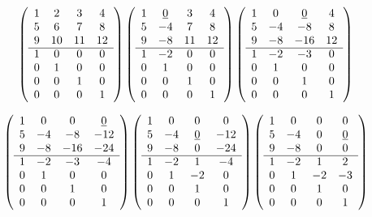 \documentclass{mai_book}
\begin{document}
{\[
\left( \begin{array}{cccc}
1 &  2 &  3 &  4 \\
5 &  6 &  7 &  8 \\
9 & 10 & 11 & 12 \\ \cline{1-4}
1 &  0 &  0 &  0 \\
0 &  1 &  0 &  0 \\
0 &  0 &  1 &  0 \\
0 &  0 &  0 &  1
\end{array} \right)
\left( \begin{array}{cccc}
1 &  \underline{0} &  3 &  4 \\
5 & -4 &  7 &  8 \\
9 & -8 & 11 & 12 \\ \cline{1-4}
1 & -2 &  0 &  0 \\
0 &  1 &  0 &  0 \\
0 &  0 &  1 &  0 \\
0 &  0 &  0 &  1
\end{array} \right) 
\left( \begin{array}{cccc}
1 &  0 &   \underline{0} &  4 \\
5 & -4 &  -8 &  8 \\
9 & -8 & -16 & 12 \\ \cline{1-4}
1 & -2 &  -3 &  0 \\
0 &  1 &   0 &  0 \\
0 &  0 &   1 &  0 \\
0 &  0 &   0 &  1
\end{array} \right) \]

\[ \left( \begin{array}{cccc}
1 &  0 &   0 &   \underline{0} \\
5 & -4 &  -8 & -12 \\
9 & -8 & -16 & -24 \\ \cline{1-4}
1 & -2 &  -3 &  -4 \\
0 &  1 &   0 &   0 \\
0 &  0 &   1 &   0 \\
0 &  0 &   0 &   1
\end{array} \right) 
\left( \begin{array}{cccc}
1 &  0 &  0 &   0 \\
5 & -4 &  \underline{0} & -12 \\
9 & -8 &  0 & -24 \\ \cline{1-4}
1 & -2 &  1 &  -4 \\
0 &  1 & -2 &   0 \\
0 &  0 &  1 &   0 \\
0 &  0 &  0 &   1
\end{array} \right) 
\left( \begin{array}{cccc}
1 &  0 &  0 &  0 \\
5 & -4 &  0 &  \underline{0} \\
9 & -8 &  0 &  0 \\ \cline{1-4}
1 & -2 &  1 &  2 \\
0 &  1 & -2 & -3 \\
0 &  0 &  1 &  0 \\
0 &  0 &  0 &  1
\end{array} \right) \]

}
\end{document}
